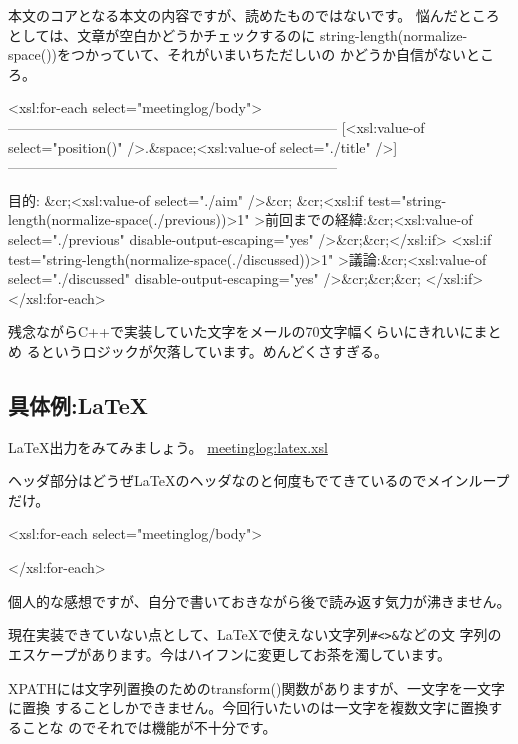 \documentclass[mingoth,a4paper]{jsarticle}
\begin{document}
本文のコアとなる本文の内容ですが、読めたものではないです。
悩んだところとしては、文章が空白かどうかチェックするのに
string-length(normalize-space())をつかっていて、それがいまいちただしいの
かどうか自信がないところ。

\begin{commandline}
    <xsl:for-each select="meetinglog/body">
-----------------------------------------------------------------------
[<xsl:value-of select="position()" />.&space;<xsl:value-of select="./title" />]
-----------------------------------------------------------------------

目的: &cr;<xsl:value-of select="./aim" />&cr;
&cr;<xsl:if
 test="string-length(normalize-space(./previous))>1"
 >前回までの経緯:&cr;<xsl:value-of select="./previous"
 disable-output-escaping="yes" />&cr;&cr;</xsl:if>
<xsl:if test="string-length(normalize-space(./discussed))>1"
 >議論:&cr;<xsl:value-of select="./discussed"
 disable-output-escaping="yes" />&cr;&cr;&cr;
</xsl:if>
</xsl:for-each>
\end{commandline}

残念ながらC++で実装していた文字をメールの70文字幅くらいにきれいにまとめ
るというロジックが欠落しています。めんどくさすぎる。

\subsection{具体例:\LaTeX}

\LaTeX 出力をみてみましょう。
\url{meetinglog:latex.xsl}

ヘッダ部分はどうぜ\LaTeX{}のヘッダなのと何度もでてきているのでメインループ
だけ。
\begin{commandline}
    <xsl:for-each select="meetinglog/body">

    </xsl:for-each>
\end{commandline}

個人的な感想ですが、自分で書いておきながら後で読み返す気力が沸きません。

現在実装できていない点として、\LaTeX{}で使えない文字列\verb!#<>&!などの文
字列のエスケープがあります。今はハイフンに変更してお茶を濁しています。

XPATHには文字列置換のためのtransform()関数がありますが、一文字を一文字に置換
することしかできません。今回行いたいのは一文字を複数文字に置換することな
のでそれでは機能が不十分です。
\end{document}
